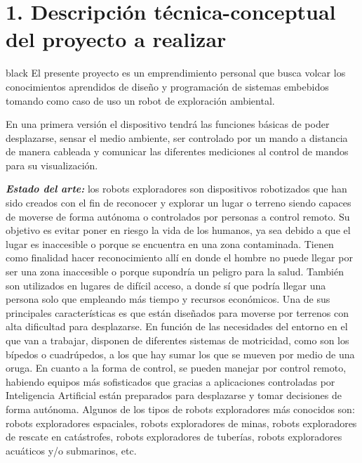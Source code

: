 \documentclass[
11pt, %
codirector, %
]{charter}
\begin{document}
\section{1. Descripción técnica-conceptual del proyecto a realizar}
\label{sec:descripcion}

\begin{consigna}{black} %
El presente proyecto es un emprendimiento personal que busca volcar los conocimientos aprendidos de diseño y programación de sistemas embebidos tomando como caso de uso un robot de exploración ambiental. 

En una primera versión el dispositivo tendrá las funciones básicas de poder desplazarse, sensar el medio ambiente, ser controlado por un mando a distancia de manera cableada y comunicar las diferentes mediciones al control de mandos para su visualización.


\textit{\textbf{Estado del arte:}}
los robots exploradores son dispositivos robotizados que han sido creados con el fin de reconocer y explorar un lugar o terreno siendo capaces de moverse de forma autónoma o controlados por personas a control remoto. Su objetivo es evitar poner en riesgo la vida de los humanos, ya sea debido a que el lugar es inaccesible o porque se encuentra en una zona contaminada.
Tienen como finalidad hacer reconocimiento allí en donde el hombre no puede llegar por ser una zona inaccesible o porque supondría un peligro para la salud. También son utilizados en lugares de difícil acceso, a donde sí que podría llegar una persona solo que empleando más tiempo y recursos económicos.
Una de sus principales características es que están diseñados para moverse por terrenos con alta dificultad para desplazarse. En función de las necesidades del entorno en el que van a trabajar, disponen de diferentes sistemas de motricidad, como son los bípedos o cuadrúpedos, a los que hay sumar los que se mueven por medio de una oruga.
En cuanto a la forma de control, se pueden manejar por control remoto, habiendo equipos más sofisticados que gracias a aplicaciones controladas por Inteligencia Artificial están preparados para desplazarse y tomar decisiones de forma autónoma.
Algunos de los tipos de robots exploradores más conocidos son: robots exploradores espaciales, robots exploradores de minas, robots exploradores de rescate en catástrofes, robots exploradores de tuberías, robots exploradores acuáticos y/o submarinos, etc.


\end{consigna}
\end{document}
